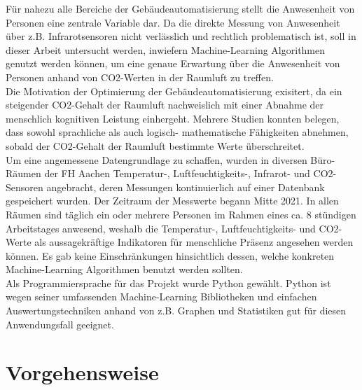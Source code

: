 Für nahezu alle Bereiche der Gebäudeautomatisierung stellt die Anwesenheit 
von Personen eine zentrale Variable dar. Da die direkte Messung von Anwesenheit über z.B. 
Infrarotsensoren nicht verlässlich und rechtlich problematisch ist, soll in dieser Arbeit untersucht werden, inwiefern 
Machine-Learning Algorithmen genutzt werden können, um eine genaue Erwartung über 
die Anwesenheit von Personen anhand von CO2-Werten in der Raumluft zu treffen.\\
Die Motivation der Optimierung der Gebäudeautomatisierung exisitert, da ein steigender CO2-Gehalt der 
Raumluft nachweislich mit einer Abnahme der menschlich kognitiven Leistung einhergeht. Mehrere Studien
konnten belegen, dass sowohl sprachliche als auch logisch- mathematische Fähigkeiten abnehmen, sobald 
der CO2-Gehalt der  Raumluft bestimmte Werte überschreitet.\\ 
Um eine angemessene Datengrundlage zu schaffen, wurden in diversen Büro-Räumen der FH Aachen Temperatur-,
Luftfeuchtigkeits-, Infrarot- und CO2-Sensoren angebracht, deren Messungen kontinuierlich auf einer Datenbank
gespeichert wurden. Der Zeitraum der Messwerte begann Mitte 2021. In allen Räumen sind täglich ein oder mehrere
Personen im Rahmen eines ca. 8 stündigen Arbeitstages anwesend, weshalb die Temperatur-, Luftfeuchtigkeits-
und CO2-Werte als aussagekräftige Indikatoren für menschliche Präsenz angesehen werden können.
Es gab keine Einschränkungen hinsichtlich dessen, welche konkreten Machine-Learning Algorithmen 
benutzt werden sollten.\\
Als Programmiersprache für das Projekt wurde Python gewählt. Python ist wegen seiner umfassenden
Machine-Learning Bibliotheken und einfachen Auswertungstechniken anhand von z.B. Graphen und Statistiken 
gut für diesen Anwendungsfall geeignet.






\newpage

\section{Vorgehensweise}

